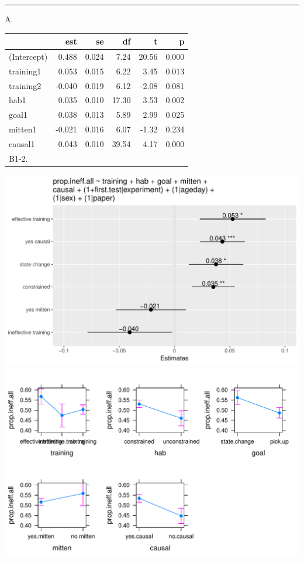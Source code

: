 \documentclass[]{article}
\begin{document}
\begin{center}\rule{0.5\linewidth}{\linethickness}\end{center}

A.

\begin{longtable}[]{@{}lrrrrr@{}}
\toprule
& est & se & df & t & p\tabularnewline
\midrule
\endhead
(Intercept) & 0.488 & 0.024 & 7.24 & 20.56 & 0.000\tabularnewline
training1 & 0.053 & 0.015 & 6.22 & 3.45 & 0.013\tabularnewline
training2 & -0.040 & 0.019 & 6.12 & -2.08 & 0.081\tabularnewline
hab1 & 0.035 & 0.010 & 17.30 & 3.53 & 0.002\tabularnewline
goal1 & 0.038 & 0.013 & 5.89 & 2.99 & 0.025\tabularnewline
mitten1 & -0.021 & 0.016 & 6.07 & -1.32 & 0.234\tabularnewline
causal1 & 0.043 & 0.010 & 39.54 & 4.17 & 0.000\tabularnewline
B1-2. & & & & &\tabularnewline
\bottomrule
\end{longtable}

\includegraphics{lumi_analysis_files/figure-latex/meta_figure-1.pdf}
\includegraphics{lumi_analysis_files/figure-latex/meta_figure-2.pdf}
\end{document}
